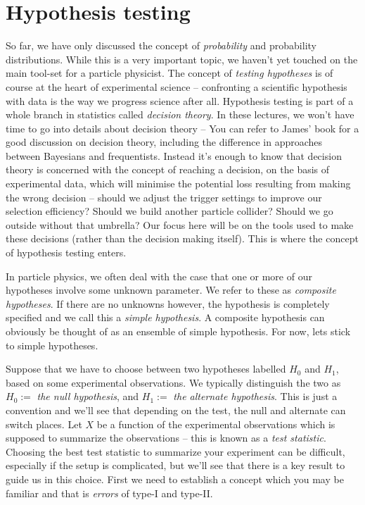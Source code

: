 \section{Hypothesis testing}\label{sec:hypotest}
So far, we have only discussed the concept of \emph{probability} and probability distributions. While this is a very important topic, we haven't yet touched on the main tool-set for a particle physicist.  The concept of \emph{testing hypotheses} is of course at the heart of experimental science -- confronting a scientific hypothesis with data is the way we progress science after all.  Hypothesis testing is part of a whole branch in statistics called \emph{decision theory}. In these lectures, we won't have time to go into details about decision theory -- You can refer to James' book for a good discussion on decision theory, including the difference in approaches between Bayesians and frequentists. Instead it's enough to know that decision theory is concerned with the concept of reaching a decision, on the basis of experimental data, which will minimise the potential loss resulting from making the wrong decision -- should we adjust the trigger settings to improve our selection efficiency? Should we build another particle collider? Should we go outside without that umbrella? Our focus here will be on the tools used to make these decisions (rather than the decision making itself). This is where the concept of hypothesis testing enters.

In particle physics, we often deal with the case that one or more of our hypotheses involve some unknown parameter. We refer to these as \emph{composite hypotheses}. If there are no unknowns however, the hypothesis is completely specified and we call this a \emph{simple hypothesis}. A composite hypothesis can obviously be thought of as an ensemble of simple hypothesis. For now, lets stick to simple hypotheses. 
 
 Suppose that we have to choose between two hypotheses labelled $H_{0}$ and $H_{1}$, based on some experimental observations. We typically distinguish the two as $H_{0}:=$ \emph{the null hypothesis}, and $H_{1}:=$ \emph{the alternate hypothesis}. This is just a convention and we'll see that depending on the test, the null and alternate can switch places.  Let $X$ be a function of the experimental observations which is supposed to summarize the observations -- this is known as a \emph{test statistic}. Choosing the best test statistic to summarize your experiment can be difficult, especially if the setup is complicated, but we'll see that there is a key result to guide us in this choice. First we need to establish a concept which you may be familiar and that is \emph{errors} of type-I and type-II. 
 
